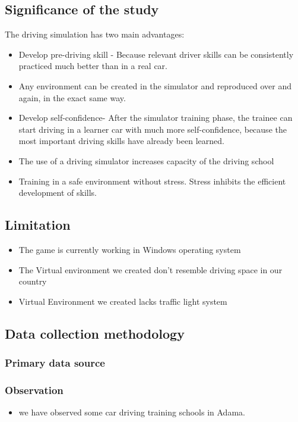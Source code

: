\documentclass[12pt,a4paper]{article}
\begin{document}
\subsection{Significance of the study}

The driving simulation has two main advantages:
\begin{itemize}
	\item 
	Develop pre-driving skill - Because relevant driver skills can be consistently practiced much better than in a real car.
	\item 
	Any environment can be created in the simulator and reproduced over and again, in the exact same way.
	\item 
	Develop self-confidence- After the simulator training phase, the trainee can start driving in a learner car with much more self-confidence, because the most important driving skills have already been learned.
	\item 
	The use of a driving simulator increases capacity of the driving school
	\item 
	Training in a safe environment without stress. Stress inhibits the efficient development of skills.
	
\end{itemize}

\subsection{Limitation}
\begin{itemize}
	\item 
	The game is currently working in Windows operating system
	\item 
	The Virtual environment we created don't resemble driving space in our country 
		\item 
	Virtual Environment we created lacks traffic light system
\end{itemize}
\subsection{Data collection methodology}
\subsubsection{Primary data source}
\subsubsection*{Observation}
\begin{itemize}
	\item 
	we have observed some car driving training schools in Adama. 
\end{itemize}
\end{document}
